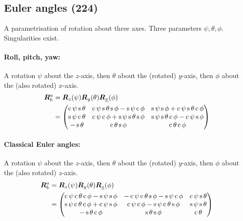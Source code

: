\documentclass[a4paper, 12pt]{article}
\begin{document}
\subsection{Euler angles (224)}
A parametrisation of rotation about three axes. Three parameters \( \psi, \theta, \phi \). Singularities exist.
\paragraph{Roll, pitch, yaw:} A rotation \( \psi \) about the \( z \)-axis, then \( \theta \) about the (rotated) \( y \)-axis, then \( \phi \) about the (also rotated) \( x \)-axis.
\begin{equation}
	\begin{aligned}
		\R^a_b &= \R_z(\psi) \R_y(\theta) \R_{\underline{x}}(\phi) \\
		&=
		\begin{pmatrix}
			\c\psi \s\theta & \c\psi \s\theta \s\phi - \s\psi \c\phi & \s\psi \s\phi + \c\psi \s\theta \c\phi \\
			\s\psi \c\theta & \c\psi \c\phi + \s\psi \s\theta \s\phi & \s\psi \s\theta \c\phi - \c\psi \s\phi \\
			-\s\theta       & \c\theta \s\phi                        & \c\theta \c\phi                        \\
		\end{pmatrix}
	\end{aligned}
\end{equation}
\paragraph{Classical Euler angles:} A rotation \( \psi \) about the \( z \)-axis, then \( \theta \) about the (rotated) \( y \)-axis, then \( \phi \) about the (also rotated) \( z \)-axis.
\begin{equation}
	\begin{aligned}
	\R^a_b &= \R_z(\psi) \R_y(\theta) \R_{\underline{z}}(\phi) \\
	&=
	\begin{pmatrix}
		\c\psi \c\theta \c\phi - \s\psi \s\phi & -\c\psi \c\theta \s\phi - \s\psi \c\phi & \c\psi \s\theta \\
		\s\psi \c\theta \c\phi + \c\psi \s\phi & \c\psi \c\phi - \s\psi \c\theta \s\phi  & \s\psi \s\theta \\
		-\s\theta \c\phi                       & \s\theta \s\phi                         & \c\theta        \\
	\end{pmatrix}
	\end{aligned}
\end{equation}
\end{document}

